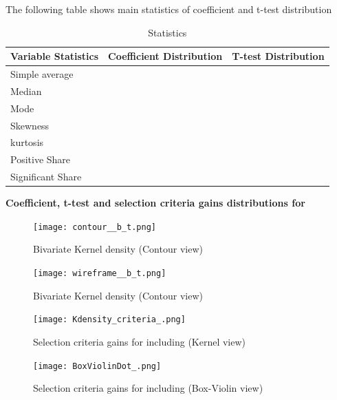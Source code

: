 \documentclass{article}
\begin{document}
\vspace{1cm}

The following table shows main statistics of coefficient and t-test distribution 

\begin{table}[!h]
    \centering
    \caption{Statistics}
    \begin{tabular}{|l|c|c|}
    \hline
    Variable  Statistics &  Coefficient Distribution &  T-test Distribution  \\
    \hline
    \hline
    Simple average    &       &  \\
    \hline
    Median            &    &  \\
    \hline
    Mode              &      &  \\
    \hline
    Skewness          &       &  \\
    \hline
    kurtosis          &      &  \\
    \hline
    Positive Share    &      &  \\
    \hline
    Significant Share &  &  \\
    \hline
    \end{tabular}
\end{table}

\clearpage
\begin{center}
    \large{\textbf{Coefficient, t-test and selection criteria gains distributions for  }}
\end{center}

\vspace{-5mm}

\begin{figure}[!ht]
  \centering
  \begin{minipage}[b]{0.46\textwidth}
    \centering
    \texttt{[image: contour\_\_b\_t.png]}
    \caption{Bivariate Kernel density (Contour view)}
  \end{minipage}
  \hfill
  \begin{minipage}[b]{0.53\textwidth}
    \centering
    \texttt{[image: wireframe\_\_b\_t.png]}
    \caption{Bivariate Kernel density (Contour view)}
  \end{minipage}

  \begin{minipage}[b]{0.48\textwidth}
    \centering
    \texttt{[image: Kdensity\_criteria\_.png]}
    \caption{Selection criteria gains for including  (Kernel view)}
  \end{minipage}
  \hfill
  \begin{minipage}[b]{0.48\textwidth}
    \centering    
    \texttt{[image: BoxViolinDot\_.png]}
    \caption{Selection criteria gains for including  (Box-Violin view)}    
  \end{minipage}
\end{figure}
\end{document}
